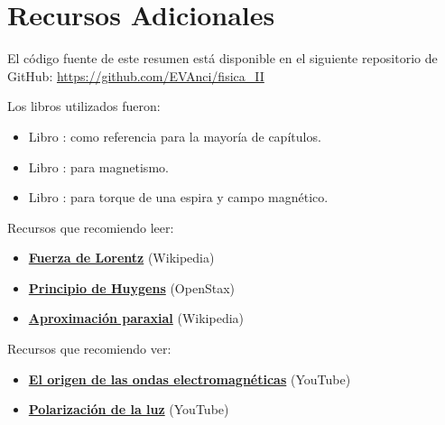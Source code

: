 \documentclass[a4paper,12pt]{article}  %
\begin{document}
  \section*{Recursos Adicionales}
  \noindent El código fuente de este resumen está disponible en el siguiente repositorio de GitHub: \url{https://github.com/EVAnci/fisica_II}
  \vspace{5pt}

  \noindent Los libros utilizados fueron:
  \begin{itemize}
    \item Libro \cite{Serway}: como referencia para la mayoría de capítulos.
    \item Libro \cite{Sears_Zemansky}: para magnetismo.
    \item Libro \cite{openstax}: para torque de una espira y campo magnético.
  \end{itemize}
  \vspace{5pt}
  
  \noindent Recursos que recomiendo leer:
  \begin{itemize}
    \item \href{https://es.wikipedia.org/wiki/Fuerza_de_Lorentz}{\textbf{Fuerza de Lorentz}} (Wikipedia)
    \item \href{https://openstax.org/books/f%C3%ADsica-universitaria-volumen-3/pages/1-6-principio-de-huygens}{\textbf{Principio de Huygens}} (OpenStax)
    \item \href{https://es.wikipedia.org/wiki/Aproximaci%C3%B3n_paraxial}{\textbf{Aproximación paraxial}} (Wikipedia)
  \end{itemize}
  \vspace{5pt}

  \noindent Recursos que recomiendo ver:
  \begin{itemize}
    \item \href{https://www.youtube.com/watch?v=cKKM9boWqZs}{\textbf{El origen de las ondas electromagnéticas}} (YouTube)
    \item \href{https://www.youtube.com/watch?v=PMjADwpLlfs}{\textbf{Polarización de la luz}} (YouTube)
  \end{itemize}
  \newpage
  
  \newpage
  \printbibliography
\end{document}
